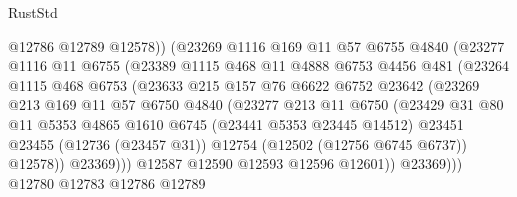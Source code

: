 \begin{lexlean}{RustStd}
\begin{coremodule}
                          @12786
                          @12789
                          @12578))
                      (@23269
                        @1116
                        @169
                        @11
                        @57
                        @6755
                        @4840
                        (@23277
                          @1116
                          @11
                          @6755
                          (@23389
                            @1115
                            @468
                            @11
                            @4888
                            @6753
                            @4456
                            @481
                            (@23264
                              @1115
                              @468
                              @6753
                              (@23633
                                @215
                                @157
                                @76
                                @6622
                                @6752
                                @23642
                                (@23269
                                  @213
                                  @169
                                  @11
                                  @57
                                  @6750
                                  @4840
                                  (@23277
                                    @213
                                    @11
                                    @6750
                                    (@23429
                                      @31
                                      @80
                                      @11
                                      @5353
                                      @4865
                                      @1610
                                      @6745
                                      (@23441 @5353 @23445 @14512)
                                      @23451
                                      @23455
                                      (@12736 (@23457 @31))
                                      @12754
                                      (@12502 (@12756 @6745 @6737))
                                      @12578))
                                  @23369)))
                            @12587
                            @12590
                            @12593
                            @12596
                            @12601))
                        @23369)))
                  @12780
                  @12783
                  @12786
                  @12789

\end{coremodule}
\end{lexlean}
